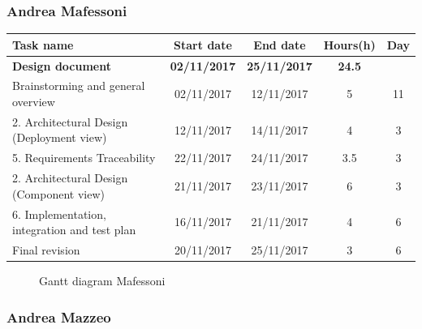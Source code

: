 
\subsubsection{Andrea Mafessoni}

\begin{table}[h!]
	\begin{tabular}{lcccc}
		\toprule
		\textbf{Task name} & \textbf{Start date} & \textbf{End date} & \textbf{Hours(h)} & \textbf{Day} \\
		\midrule
		\textbf{Design document} & \textbf{02/11/2017} & \textbf{25/11/2017} & \textbf{24.5} & \\
		Brainstorming and general overview & 02/11/2017 & 12/11/2017 & 5 & 11 \\
		2. Architectural Design (Deployment view) & 12/11/2017 & 14/11/2017 & 4 & 3 \\
		5. Requirements Traceability & 22/11/2017 & 24/11/2017 & 3.5 & 3 \\
		2. Architectural Design (Component view) & 21/11/2017 & 23/11/2017 & 6 & 3 \\
		6. Implementation, integration and test plan & 16/11/2017 & 21/11/2017 & 4 & 6 \\
		\bottomrule
		Final revision & 20/11/2017 & 25/11/2017 & 3 & 6 \\
	\end{tabular}
\end{table}

\begin{figure}[!h]
	\centering
	\caption{Gantt diagram Mafessoni}
\end{figure}
\clearpage

\subsubsection{Andrea Mazzeo}

